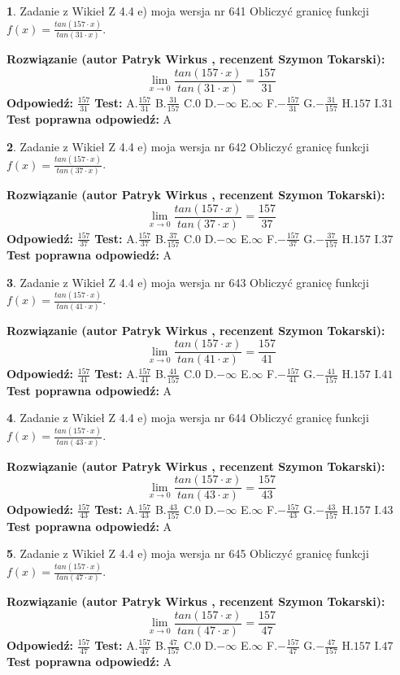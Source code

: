 \documentclass[12pt, a4paper]{article}
\theoremstyle{definition} %
\newtheorem{zad}{}
\newcommand{\zadStart}[1]{\begin{zad}#1\newline}
\newcommand{\zadStop}{\end{zad}}
\newcommand{\rozwStart}[2]{\noindent \textbf{Rozwiązanie (autor #1 , recenzent #2): }\newline}
\newcommand{\rozwStop}{\newline}
\newcommand{\odpStart}{\noindent \textbf{Odpowiedź:}\newline}
\newcommand{\odpStop}{\newline}
\newcommand{\testStart}{\noindent \textbf{Test:}\newline}
\newcommand{\testStop}{\newline}
\newcommand{\kluczStart}{\noindent \textbf{Test poprawna odpowiedź:}\newline}
\newcommand{\kluczStop}{\newline}
\begin{document}
\zadStart{Zadanie z Wikieł Z 4.4 e) moja wersja nr 641}
Obliczyć granicę funkcji $f(x)=\frac{tan(157\cdot x)}{tan(31\cdot x)}$.
\zadStop
\rozwStart{Patryk Wirkus}{Szymon Tokarski}
$$\lim\limits_{x\to 0}\frac{tan(157\cdot x)}{tan(31\cdot x)}=
\frac{157}{31}$$
\rozwStop
\odpStart
$\frac{157}{31}$
\odpStop
\testStart
A.$\frac{157}{31}$
B.$\frac{31}{157}$
C.$0$
D.$-\infty$
E.$\infty$
F.$-\frac{157}{31}$
G.$-\frac{31}{157}$
H.$157$
I.$31$
\testStop
\kluczStart
A
\kluczStop



\zadStart{Zadanie z Wikieł Z 4.4 e) moja wersja nr 642}
Obliczyć granicę funkcji $f(x)=\frac{tan(157\cdot x)}{tan(37\cdot x)}$.
\zadStop
\rozwStart{Patryk Wirkus}{Szymon Tokarski}
$$\lim\limits_{x\to 0}\frac{tan(157\cdot x)}{tan(37\cdot x)}=
\frac{157}{37}$$
\rozwStop
\odpStart
$\frac{157}{37}$
\odpStop
\testStart
A.$\frac{157}{37}$
B.$\frac{37}{157}$
C.$0$
D.$-\infty$
E.$\infty$
F.$-\frac{157}{37}$
G.$-\frac{37}{157}$
H.$157$
I.$37$
\testStop
\kluczStart
A
\kluczStop



\zadStart{Zadanie z Wikieł Z 4.4 e) moja wersja nr 643}
Obliczyć granicę funkcji $f(x)=\frac{tan(157\cdot x)}{tan(41\cdot x)}$.
\zadStop
\rozwStart{Patryk Wirkus}{Szymon Tokarski}
$$\lim\limits_{x\to 0}\frac{tan(157\cdot x)}{tan(41\cdot x)}=
\frac{157}{41}$$
\rozwStop
\odpStart
$\frac{157}{41}$
\odpStop
\testStart
A.$\frac{157}{41}$
B.$\frac{41}{157}$
C.$0$
D.$-\infty$
E.$\infty$
F.$-\frac{157}{41}$
G.$-\frac{41}{157}$
H.$157$
I.$41$
\testStop
\kluczStart
A
\kluczStop



\zadStart{Zadanie z Wikieł Z 4.4 e) moja wersja nr 644}
Obliczyć granicę funkcji $f(x)=\frac{tan(157\cdot x)}{tan(43\cdot x)}$.
\zadStop
\rozwStart{Patryk Wirkus}{Szymon Tokarski}
$$\lim\limits_{x\to 0}\frac{tan(157\cdot x)}{tan(43\cdot x)}=
\frac{157}{43}$$
\rozwStop
\odpStart
$\frac{157}{43}$
\odpStop
\testStart
A.$\frac{157}{43}$
B.$\frac{43}{157}$
C.$0$
D.$-\infty$
E.$\infty$
F.$-\frac{157}{43}$
G.$-\frac{43}{157}$
H.$157$
I.$43$
\testStop
\kluczStart
A
\kluczStop



\zadStart{Zadanie z Wikieł Z 4.4 e) moja wersja nr 645}
Obliczyć granicę funkcji $f(x)=\frac{tan(157\cdot x)}{tan(47\cdot x)}$.
\zadStop
\rozwStart{Patryk Wirkus}{Szymon Tokarski}
$$\lim\limits_{x\to 0}\frac{tan(157\cdot x)}{tan(47\cdot x)}=
\frac{157}{47}$$
\rozwStop
\odpStart
$\frac{157}{47}$
\odpStop
\testStart
A.$\frac{157}{47}$
B.$\frac{47}{157}$
C.$0$
D.$-\infty$
E.$\infty$
F.$-\frac{157}{47}$
G.$-\frac{47}{157}$
H.$157$
I.$47$
\testStop
\kluczStart
A
\kluczStop
\end{document}
